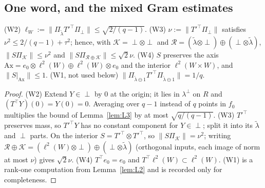 \subsection{One word, and the mixed Gram estimates}
\begin{lemma}[W1--W4]\label{lem:W}
(W2) $\ell_W:=\|\Pi_{\tilde\lambda}T'^\top\Pi_\perp\|\le\sqrt{2/(q-1)}$. (W3) $\nu:=\|T'^\top\Pi_\perp\|$ satisfies $\nu^2\le2/(q-1)+\tau^2$; hence, with
$\mathcal K=\perp\otimes\perp$ and $\mathcal R=(\tilde\lambda\otimes\perp)\oplus(\perp\otimes\tilde\lambda)$, $\|S\Pi_{\mathcal K}\|\le\nu^2$ and $\|S\Pi_{\mathcal R\oplus\mathcal K}\|\le\sqrt2\nu$.
(W4) $S$ preserves the axis $\mathrm{Ax}=e_0\otimes\ell^2(W)\oplus\ell^2(W)\otimes e_0$ and the interior $\ell^2(W\times W)$, and $\|S|_{\mathrm{Ax}}\|\le1$.
(W1, not used below) $\|\Pi_{\tilde\lambda\ominus1}T'^\top\Pi_{\tilde\lambda\ominus1}\|=1/q$.
\end{lemma}
\begin{proof}
(W2) Extend $Y\in\perp$ by $0$ at the origin; it lies in $\lambda^\perp$ on $R$ and $(T^\top Y)(0)=Y(0)=0$. Averaging over $q-1$ instead of $q$ points in $f_0$
multiplies the bound of Lemma~\ref{lem:L3} by at most $\sqrt{q/(q-1)}$. (W3) $T'^\top$ preserves mass, so $T'^\top Y$ has no constant component for $Y\in\perp$;
split it into its $\tilde\lambda$ and $\perp$ parts. On the interior $S=T'^\top\otimes T'^\top$, so $\|S\Pi_{\mathcal K}\|=\nu^2$; writing
$\mathcal R\oplus\mathcal K=(\ell^2(W)\otimes\perp)\oplus(\perp\otimes\tilde\lambda)$ (orthogonal inputs, each image of norm at most $\nu$) gives $\sqrt2\nu$. (W4) $T^\top e_0=e_0$ and
$T^\top\ell^2(W)\subset\ell^2(W)$. (W1) is a rank-one computation from Lemma~\ref{lem:L2} and is recorded only for completeness.
\end{proof}


